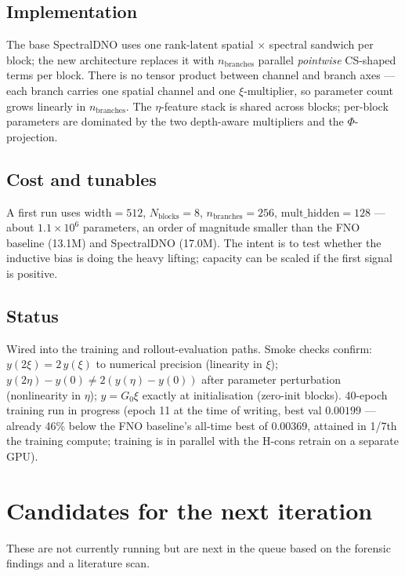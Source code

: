 \documentclass[11pt,letterpaper]{article}
\begin{document}
\subsection{Implementation}
The base SpectralDNO uses one rank-$\mathrm{latent}$ spatial $\times$
spectral sandwich per block; the new architecture replaces it with
$n_{\mathrm{branches}}$ parallel \emph{pointwise} CS-shaped terms per
block. There is no tensor product between channel and branch axes ---
each branch carries one spatial channel and one $\xi$-multiplier, so
parameter count grows linearly in $n_{\mathrm{branches}}$. The
$\eta$-feature stack is shared across blocks; per-block parameters
are dominated by the two depth-aware multipliers and the
$\Phi$-projection.

\subsection{Cost and tunables}
A first run uses $\mathrm{width}=512$, $N_{\mathrm{blocks}}=8$,
$n_{\mathrm{branches}}=256$, $\mathrm{mult\_hidden}=128$ --- about
$1.1\times 10^{6}$ parameters, an order of magnitude smaller than the
FNO baseline (13.1M) and SpectralDNO (17.0M). The intent is to test
whether the inductive bias is doing the heavy lifting; capacity can be
scaled if the first signal is positive.

\subsection{Status}
Wired into the training and rollout-evaluation paths. Smoke checks
confirm: $y(2\xi) = 2\,y(\xi)$ to numerical precision (linearity in
$\xi$); $y(2\eta) - y(0) \ne 2(y(\eta) - y(0))$ after parameter
perturbation (nonlinearity in $\eta$); $y = G_{0}\xi$ exactly at
initialisation (zero-init blocks). 40-epoch training run in progress
(epoch 11 at the time of writing, best val $0.00199$ --- already 46\% below
the FNO baseline's all-time best of $0.00369$, attained in 1/7th the
training compute;
training is in parallel with the H-cons retrain on a separate GPU).

\section{Candidates for the next iteration}

These are not currently running but are next in the queue based on the
forensic findings and a literature scan.
\end{document}
